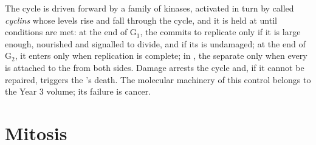 \begin{proposition}[Checkpoints]\label{prop:b1:replication-mitosis:checkpoints}
The cycle is driven forward by a family of  kinases, activated
in turn by  called \emph{cyclins} whose levels rise and fall
through the cycle, and it is held at \emph{} until
conditions are met: at the end of G$_1$, the  commits to
replicate only if it is large enough, nourished and signalled to
divide, and if its  is undamaged; at the end of G$_2$, it enters
 only when replication is complete; in , the 
separate only when every  is attached to the  from
both sides. Damage arrests the cycle and, if it cannot be repaired,
triggers the 's death. The molecular machinery of this control
belongs to the Year 3 volume; its failure is cancer.
\end{proposition}

\section{Mitosis}


